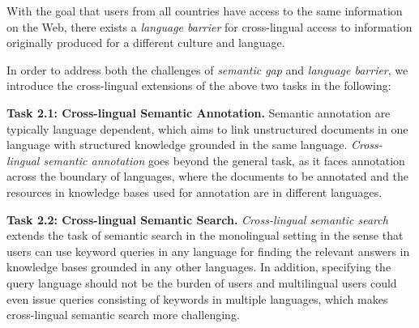 With the goal that users from all countries have access to the same information on the Web, 
there exists a \emph{language barrier} for 
cross-lingual access to information originally produced for a different culture and language. 

In order to address both the challenges of \emph{semantic gap} and \emph{language barrier}, we introduce the cross-lingual extensions of the above two tasks in the following:

\noindent  \textbf{Task 2.1: Cross-lingual Semantic Annotation.} 
Semantic annotation are typically language dependent, which aims to link unstructured documents in one language with structured knowledge grounded in the same language. 
\emph{Cross-lingual semantic annotation} goes beyond the general task, as it faces annotation across the boundary of languages, where the documents to be annotated and the resources in knowledge bases used for annotation are in different languages.

\noindent  \textbf{Task 2.2: Cross-lingual Semantic Search.} 
\emph{Cross-lingual semantic search} 
extends the task of semantic search in the monolingual setting in the sense that users can use keyword queries in any language for finding the relevant answers in knowledge bases grounded in any other languages.
In addition, specifying the query language should not be the burden of users and multilingual users could even issue queries consisting of keywords in multiple languages, which makes cross-lingual semantic search more challenging.

